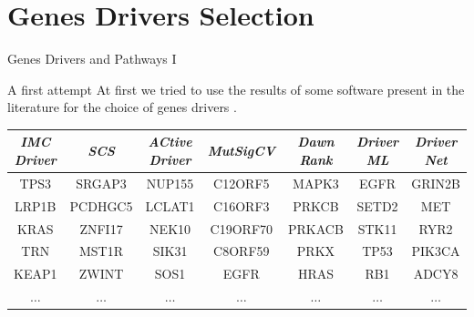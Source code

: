 \documentclass{beamer}
\begin{document}
\section{Genes Drivers Selection}
\begin{frame}{Genes Drivers and Pathways I}
  \begin{block}{A first attempt}
    At first we tried to use the results of some software present in the
    literature for the choice of genes drivers \cite{imcdriver}. 
  \end{block}
  \pause
  \begin{table}[H]
    \tiny
    \centering

  \begin{tabular}{|c|c|c|c|c|c|c|}
    \hline {\color{nordgreen}\textit{\textbf{IMC Driver}}} & \textit{SCS}
    & \textit{ACtive Driver} & {\color{nordgreen}\textit\textbf{{MutSigCV}}}
    & \textit{Dawn Rank} & \textit{Driver ML} & \textit{Driver Net} \\
    \hline
    \hline TPS3 & SRGAP3 & NUP155 & C12ORF5 & MAPK3 & EGFR & GRIN2B \\
    \hline LRP1B & PCDHGC5 & LCLAT1 & C16ORF3 & PRKCB & SETD2 & MET \\
    \hline KRAS & ZNFI17 & NEK10 & C19ORF70 & PRKACB & STK11 & RYR2 \\
    \hline TRN & MST1R & SIK31 & C8ORF59 & PRKX & TP53 & PIK3CA \\
    \hline KEAP1 & ZWINT & SOS1 & EGFR & HRAS & RB1 & ADCY8 \\
    \hline$\ldots$ & $\ldots$ & $\ldots$ & $\ldots$ & $\ldots$ & $\ldots$
                                              & $\ldots$ \\
    \hline
  \end{tabular}

  \end{table}
\end{frame}
\end{document}
